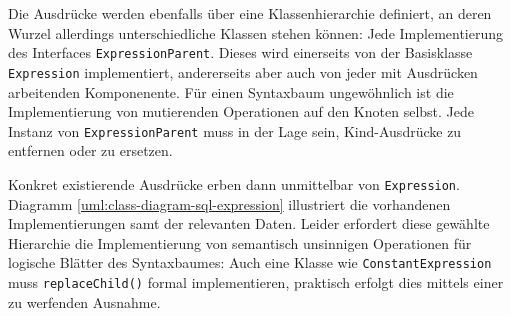 Die Ausdrücke werden ebenfalls über eine Klassenhierarchie definiert, an deren Wurzel allerdings unterschiedliche Klassen stehen können: Jede Implementierung des Interfaces \texttt{ExpressionParent}. Dieses wird einerseits von der Basisklasse \texttt{Expression} implementiert, andererseits aber auch von jeder mit Ausdrücken arbeitenden Komponenente. Für einen Syntaxbaum ungewöhnlich ist die Implementierung von mutierenden Operationen auf den Knoten selbst. Jede Instanz von \texttt{ExpressionParent} muss in der Lage sein, Kind-Ausdrücke zu entfernen oder zu ersetzen.

Konkret existierende Ausdrücke erben dann unmittelbar von \texttt{Expression}. Diagramm \ref{uml:class-diagram-sql-expression} illustriert die vorhandenen Implementierungen samt der relevanten Daten. Leider erfordert diese gewählte Hierarchie die Implementierung von semantisch unsinnigen Operationen für logische Blätter des Syntaxbaumes: Auch eine Klasse wie \texttt{ConstantExpression} muss \texttt{replaceChild()} formal implementieren, praktisch erfolgt dies mittels einer zu werfenden Ausnahme.

